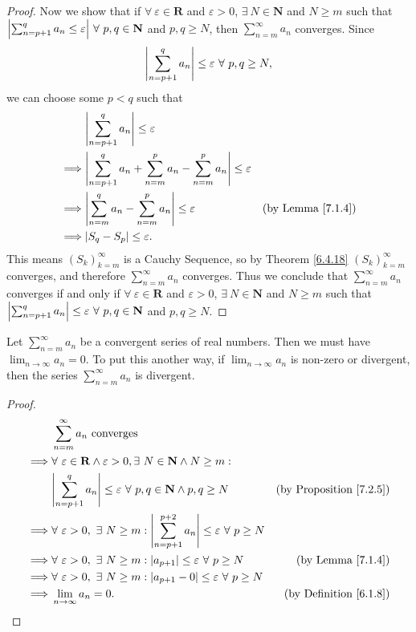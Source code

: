 \begin{proof}
Now we show that if \(\forall\ \varepsilon \in \mathbf{R}\) and \(\varepsilon > 0\), \(\exists\ N \in \mathbf{N}\) and \(N \geq m\) such that \(\abs*{\sum_{n = p + 1}^q a_n \leq \varepsilon} \ \forall\ p, q \in \mathbf{N}\) and \(p, q \geq N\), then \(\sum_{n = m}^\infty a_n\) converges.
Since
\[
    \abs*{\sum_{n = p + 1}^q a_n} \leq \varepsilon \ \forall\ p, q \geq N,
\]
we can choose some \(p < q\) such that
\begin{align*}
& \abs*{\sum_{n = p + 1}^q a_n} \leq \varepsilon \\
\implies & \abs*{\sum_{n = p + 1}^q a_n + \sum_{n = m}^p a_n - \sum_{n = m}^p a_n} \leq \varepsilon \\
\implies & \abs*{\sum_{n = m}^q a_n - \sum_{n = m}^p a_n} \leq \varepsilon & \text{(by Lemma \ref{7.1.4})} \\
\implies & \abs*{S_q - S_p} \leq \varepsilon.
\end{align*}
This means \((S_k)_{k = m}^\infty\) is a Cauchy Sequence, so by Theorem \ref{6.4.18} \((S_k)_{k = m}^\infty\) converges, and therefore \(\sum_{n = m}^\infty a_n\) converges.
Thus we conclude that \(\sum_{n = m}^\infty a_n\) converges if and only if \(\forall\ \varepsilon \in \mathbf{R}\) and \(\varepsilon > 0\), \(\exists\ N \in \mathbf{N}\) and \(N \geq m\) such that \(\abs*{\sum_{n = p + 1}^q a_n} \leq \varepsilon \ \forall\ p, q \in \mathbf{N}\) and \(p, q \geq N\).
\end{proof}

\begin{corollary}\label{7.2.6}
Let \(\sum_{n = m}^\infty a_n\) be a convergent series of real numbers.
Then we must have \(\lim_{n \to \infty} a_n = 0\).
To put this another way, if \(\lim_{n \to \infty} a_n\) is non-zero or divergent, then the series \(\sum_{n = m}^\infty a_n\) is divergent.
\end{corollary}

\begin{proof}
\begin{align*}
& \sum_{n = m}^\infty a_n \text{ converges} \\
\implies & \forall\ \varepsilon \in \mathbf{R} \land \varepsilon > 0, \exists\ N \in \mathbf{N} \land N \geq m : \\
& \abs*{\sum_{n = p + 1}^q a_n} \leq \varepsilon \ \forall\ p, q \in \mathbf{N} \land p, q \geq N & \text{(by Proposition \ref{7.2.5})} \\
\implies & \forall\ \varepsilon > 0, \ \exists\ N \geq m : \abs*{\sum_{n = p + 1}^{p + 2} a_n} \leq \varepsilon \ \forall\ p \geq N \\
\implies & \forall\ \varepsilon > 0, \ \exists\ N \geq m : \abs*{a_{p + 1}} \leq \varepsilon \ \forall\ p \geq N & \text{(by Lemma \ref{7.1.4})} \\
\implies & \forall\ \varepsilon > 0, \ \exists\ N \geq m : \abs*{a_{p + 1} - 0} \leq \varepsilon \ \forall\ p \geq N \\
\implies & \lim_{n \to \infty} a_n = 0. & \text{(by Definition \ref{6.1.8})}
\end{align*}
\end{proof}

